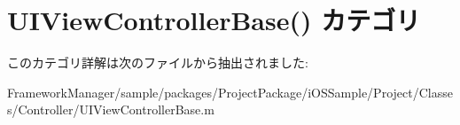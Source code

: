 \hypertarget{category_u_i_view_controller_base_07_08}{}\section{U\+I\+View\+Controller\+Base() カテゴリ}
\label{category_u_i_view_controller_base_07_08}


このカテゴリ詳解は次のファイルから抽出されました\+:\begin{DoxyCompactItemize}
\item 
Framework\+Manager/sample/packages/\+Project\+Package/i\+O\+S\+Sample/\+Project/\+Classes/\+Controller/U\+I\+View\+Controller\+Base.\+m\end{DoxyCompactItemize}
